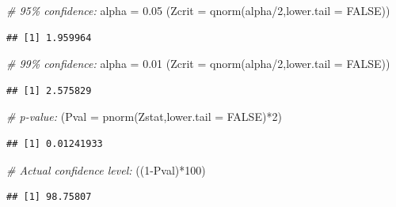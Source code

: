 \documentclass[
]{book}
\newenvironment{Shaded}{\begin{snugshade}}{\end{snugshade}}
\newcommand{\AttributeTok}[1]{\textcolor[rgb]{0.77,0.63,0.00}{#1}}
\newcommand{\CommentTok}[1]{\textcolor[rgb]{0.56,0.35,0.01}{\textit{#1}}}
\newcommand{\ConstantTok}[1]{\textcolor[rgb]{0.00,0.00,0.00}{#1}}
\newcommand{\DecValTok}[1]{\textcolor[rgb]{0.00,0.00,0.81}{#1}}
\newcommand{\FloatTok}[1]{\textcolor[rgb]{0.00,0.00,0.81}{#1}}
\newcommand{\FunctionTok}[1]{\textcolor[rgb]{0.00,0.00,0.00}{#1}}
\newcommand{\NormalTok}[1]{#1}
\newcommand{\OtherTok}[1]{\textcolor[rgb]{0.56,0.35,0.01}{#1}}
\newcommand{\SpecialCharTok}[1]{\textcolor[rgb]{0.00,0.00,0.00}{#1}}
\begin{document}
\begin{Shaded}
\begin{Highlighting}[]
\CommentTok{\# 95\% confidence:}
\NormalTok{alpha }\OtherTok{=} \FloatTok{0.05}
\NormalTok{(}\AttributeTok{Zcrit =} \FunctionTok{qnorm}\NormalTok{(alpha}\SpecialCharTok{/}\DecValTok{2}\NormalTok{,}\AttributeTok{lower.tail =} \ConstantTok{FALSE}\NormalTok{))}
\end{Highlighting}
\end{Shaded}

\begin{verbatim}
## [1] 1.959964
\end{verbatim}

\begin{Shaded}
\begin{Highlighting}[]
\CommentTok{\# 99\% confidence:}
\NormalTok{alpha }\OtherTok{=} \FloatTok{0.01}
\NormalTok{(}\AttributeTok{Zcrit =} \FunctionTok{qnorm}\NormalTok{(alpha}\SpecialCharTok{/}\DecValTok{2}\NormalTok{,}\AttributeTok{lower.tail =} \ConstantTok{FALSE}\NormalTok{))}
\end{Highlighting}
\end{Shaded}

\begin{verbatim}
## [1] 2.575829
\end{verbatim}

\begin{Shaded}
\begin{Highlighting}[]
\CommentTok{\# p{-}value:}
\NormalTok{(}\AttributeTok{Pval =} \FunctionTok{pnorm}\NormalTok{(Zstat,}\AttributeTok{lower.tail =} \ConstantTok{FALSE}\NormalTok{)}\SpecialCharTok{*}\DecValTok{2}\NormalTok{)}
\end{Highlighting}
\end{Shaded}

\begin{verbatim}
## [1] 0.01241933
\end{verbatim}

\begin{Shaded}
\begin{Highlighting}[]
\CommentTok{\# Actual confidence level:}
\NormalTok{((}\DecValTok{1}\SpecialCharTok{{-}}\NormalTok{Pval)}\SpecialCharTok{*}\DecValTok{100}\NormalTok{)}
\end{Highlighting}
\end{Shaded}

\begin{verbatim}
## [1] 98.75807
\end{verbatim}
\end{document}
